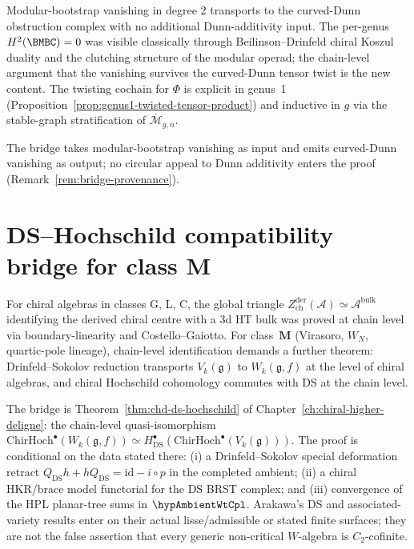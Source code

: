 Modular-bootstrap vanishing in degree \(2\) transports to the
curved-Dunn obstruction complex with no additional Dunn-additivity
input. The per-genus $H^{2}(\BMBC) = 0$ was visible classically through
Beilinson--Drinfeld chiral Koszul duality and the clutching structure
of the modular operad; the chain-level argument that the vanishing
survives the curved-Dunn tensor twist is the new content. The twisting
cochain for $\Phi$ is explicit in genus~1
(Proposition~\ref{prop:genus1-twisted-tensor-product}) and inductive in
$g$ via the stable-graph stratification of
$\overline{\mathcal{M}}_{g,n}$.

The bridge takes modular-bootstrap vanishing as input and emits
curved-Dunn vanishing as output; no circular appeal to Dunn additivity
enters the proof (Remark~\ref{rem:bridge-provenance}).

\section{DS--Hochschild compatibility bridge for class $\mathbf{M}$}
\label{sec:part-viii-ds-hochschild}

For chiral algebras in classes G, L, C, the global triangle
$Z^{\mathrm{der}}_{\mathrm{ch}}(\mathcal{A}) \simeq
\mathcal{A}^{\mathrm{bulk}}$ identifying the derived chiral centre
with a 3d HT bulk was proved at chain level via boundary-linearity and
Costello--Gaiotto. For class~$\mathbf{M}$ (Virasoro, $W_{N}$, quartic-pole
lineage), chain-level identification demands a further theorem:
Drinfeld--Sokolov reduction transports $V_{k}(\mathfrak{g})$ to
$W_{k}(\mathfrak{g},f)$ at the level of chiral algebras, and chiral
Hochschild cohomology commutes with DS at the chain level.

The bridge is Theorem~\ref{thm:chd-ds-hochschild} of
Chapter~\ref{ch:chiral-higher-deligne}: the chain-level
quasi-isomorphism
$\mathrm{ChirHoch}^{\bullet}(W_{k}(\mathfrak{g},f)) \simeq
H^{\bullet}_{\mathrm{DS}}(\mathrm{ChirHoch}^{\bullet}(V_{k}(\mathfrak{g})))$.
The proof is conditional on the data stated there: (i) a
Drinfeld--Sokolov special deformation retract
\(Q_{\mathrm{DS}}h+hQ_{\mathrm{DS}}=\mathrm{id}-i\circ p\) in the
completed ambient;
(ii) a chiral HKR/brace model functorial for the DS BRST complex; and
(iii) convergence of the HPL planar-tree sums in
\(\hypAmbientWtCpl\). Arakawa's DS and associated-variety results
enter on their actual lisse/admissible or stated finite surfaces; they
are not the false assertion that every generic non-critical
\(W\)-algebra is \(C_{2}\)-cofinite.

